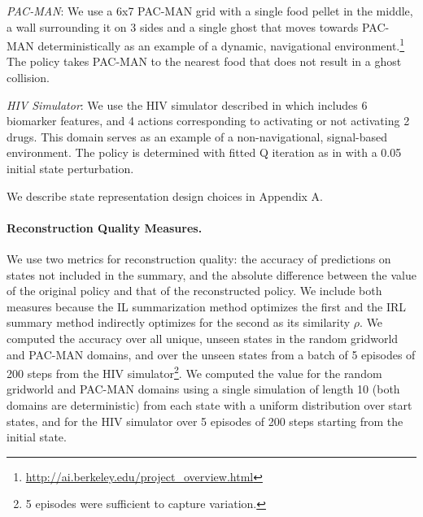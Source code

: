 \documentclass{article}
\begin{document}
\textit{PAC-MAN}: We use a 6x7 PAC-MAN grid with a single food pellet in the middle, a wall surrounding it on 3 sides and a single ghost that moves towards PAC-MAN deterministically as an example of a dynamic, navigational environment.\footnote{\url{http://ai.berkeley.edu/project_overview.html}} The policy takes PAC-MAN to the nearest food that does not result in a ghost collision. 

\textit{HIV Simulator}: We use the HIV simulator described in \cite{adams2005hiv} which includes 6 biomarker features, and 4 actions corresponding to activating or not activating 2 drugs. This domain serves as an example of a non-navigational, signal-based environment. The policy is determined with fitted Q iteration as in \cite{ernst2006clinical} with a 0.05 initial state perturbation.

We describe state representation design choices in \cite{lage2019policysummarization} Appendix A.

\paragraph{Reconstruction Quality Measures.}
We use two metrics for reconstruction quality: the accuracy of predictions on states not included in the summary, and the absolute difference between the value of the original policy and that of the reconstructed policy. We include both measures because the IL summarization method optimizes the first and the IRL summary method indirectly optimizes for the second as its similarity $\rho$. We computed the accuracy over all unique, unseen states in the random gridworld and PAC-MAN domains, and over the unseen states from a batch of 5 episodes of 200 steps from the HIV simulator\footnote{5 episodes were sufficient to capture variation.}. We computed the value for the random gridworld and PAC-MAN domains using a single simulation of length 10 (both domains are deterministic) from each state with a uniform distribution over start states, and for the HIV simulator over 5 episodes of 200 steps starting from the initial state. 
\end{document}
